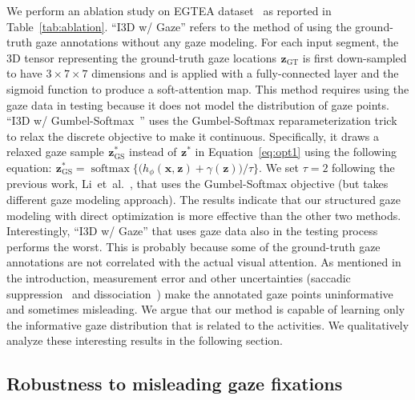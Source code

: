 \documentclass[10pt,twocolumn,letterpaper]{article}
\newcommand{\varx}{\mathbf{\mspace{1mu}x}}
\newcommand{\varz}{\mathbf{\mspace{1mu}z}}
\DeclareMathOperator*{\softmax}{softmax}
\begin{document}
\label{subsec:ablation}
We perform an ablation study on EGTEA dataset~\cite{li2018eye} as reported in Table~\ref{tab:ablation}. ``I3D w/ Gaze'' refers to the method of using the ground-truth gaze annotations without any gaze modeling. For each input segment, the 3D tensor representing the ground-truth gaze locations $\varz_{\text{GT}}$ is first down-sampled to have $3 \times 7 \times7$ dimensions and is applied with a fully-connected layer and the sigmoid function to produce a soft-attention map. This method requires using the gaze data in testing because it does not model the distribution of gaze points. ``I3D w/ Gumbel-Softmax~\cite{jang2016categorical,maddison2016concrete}'' uses the Gumbel-Softmax reparameterization trick to relax the discrete objective to make it continuous. Specifically, it draws a relaxed gaze sample $\varz_{\text{GS}}^{*}$ instead of $\varz^{*}$ in Equation~\ref{eq:opt1} using the following equation: $\varz_{\text{GS}}^{*}=\softmax \big\{ \big(h_{\phi}(\varx,\varz) +\gamma(\varz)\big)/\tau \big\}$. We set $\tau=2$ following the previous work, Li~et~al.~\cite{li2018eye}, that uses the Gumbel-Softmax objective (but takes different gaze modeling approach). The results indicate that our structured gaze modeling with direct optimization is more effective than the other two methods. Interestingly, ``I3D w/ Gaze'' that uses gaze data also in the testing process performs the worst. This is probably because some of the ground-truth gaze annotations are not correlated with the actual visual attention. As mentioned in the introduction, measurement error and other uncertainties (saccadic suppression~\cite{krekelberg2010saccadic} and dissociation~\cite{brefczynski1999physiological,juan2004dissociation}) make the annotated gaze points uninformative and sometimes misleading. We argue that our method is capable of learning only the informative gaze distribution that is related to the activities. We qualitatively analyze these interesting results in the following section.

\subsection{Robustness to misleading gaze fixations}
\end{document}
